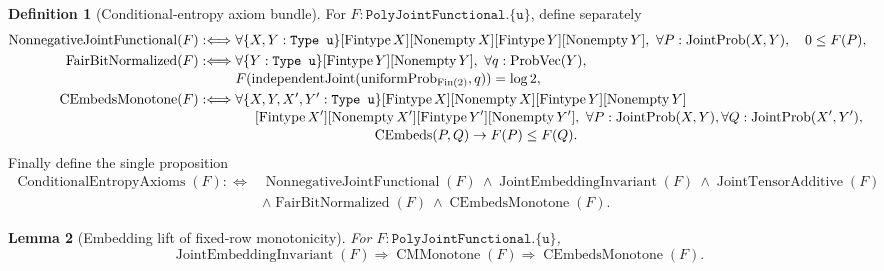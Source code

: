 \documentclass[9pt]{extarticle}
\newtheorem{lemma}{Lemma}[section]
\theoremstyle{definition}
\newtheorem{definition}[lemma]{Definition}
\theoremstyle{remark}
\begin{document}
\begin{definition}[Conditional-entropy axiom bundle]
\label{def:conditional-entropy-axioms}
For $F:\texttt{PolyJointFunctional.\{u\}}$, define separately
\begin{align*}
 \operatorname{NonnegativeJointFunctional}(F):\Longleftrightarrow{}
 &\forall\{X,Y:\texttt{Type u}\}
 [\operatorname{Fintype}X][\operatorname{Nonempty}X]
 [\operatorname{Fintype}Y][\operatorname{Nonempty}Y],\
 \forall P:\operatorname{JointProb}(X,Y),\quad0\leq F(P),\\
 \operatorname{FairBitNormalized}(F):\Longleftrightarrow{}
 &\forall\{Y:\texttt{Type u}\}
 [\operatorname{Fintype}Y][\operatorname{Nonempty}Y],\
 \forall q:\operatorname{ProbVec}(Y),\\[-2pt]
 &F(\operatorname{independentJoint}
    (\operatorname{uniformProb}_{\operatorname{Fin}(2)},q))=\log2,\\
 \operatorname{CEmbedsMonotone}(F):\Longleftrightarrow{}
 &\forall\{X,Y,X',Y':\texttt{Type u}\}
 [\operatorname{Fintype}X][\operatorname{Nonempty}X]
 [\operatorname{Fintype}Y][\operatorname{Nonempty}Y]\\[-2pt]
 &\hspace{5mm}
 [\operatorname{Fintype}X'][\operatorname{Nonempty}X']
 [\operatorname{Fintype}Y'][\operatorname{Nonempty}Y'],\
 \forall P:\operatorname{JointProb}(X,Y),
 \forall Q:\operatorname{JointProb}(X',Y'),\\[-2pt]
 &\hspace{35mm}\operatorname{CEmbeds}(P,Q)\to F(P)\leq F(Q).
\end{align*}
Finally define the single proposition
\begin{align*}
 \operatorname{ConditionalEntropyAxioms}(F):\Longleftrightarrow{}
 &\operatorname{NonnegativeJointFunctional}(F)\ 
 \wedge\operatorname{JointEmbeddingInvariant}(F)\ 
 \wedge\operatorname{JointTensorAdditive}(F)\\[-2pt]
 &\wedge\operatorname{FairBitNormalized}(F)\ 
 \wedge\operatorname{CEmbedsMonotone}(F).
\end{align*}
\end{definition}

\begin{lemma}[Embedding lift of fixed-row monotonicity]
\label{lem:embedding-lift}
For $F:\texttt{PolyJointFunctional.\{u\}}$,
\[
 \operatorname{JointEmbeddingInvariant}(F)
 \Longrightarrow
 \operatorname{CMMonotone}(F)
 \Longrightarrow
 \operatorname{CEmbedsMonotone}(F).
\]
\end{lemma}
\end{document}
